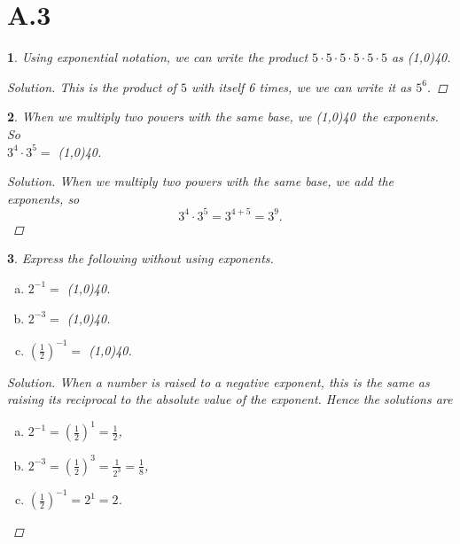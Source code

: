 \documentclass[12pt]{amsart}
\newtheorem{thm}{}
\begin{document}
\section*{A.3}

\setcounter{thm}{0}
\begin{thm}
  Using exponential notation, we can write the product $5 \cdot 5 \cdot 5 \cdot 5 \cdot 5 \cdot 5$ as \line(1,0){40}.
  
  \begin{proof}[Solution]
    This is the product of $5$ with itself 6 times, we we can write it as $5^6$.
  \end{proof}
\end{thm}

\setcounter{thm}{2}
\begin{thm}
  When we multiply two powers with the same base, we \line(1,0){40}\ the exponents.
  So\\ 
  \indent $3^4\cdot 3^5 =$ \line(1,0){40}.
  
  \begin{proof}[Solution]
    When we multiply two powers with the same base, we add the exponents, so 
    $$3^4 \cdot 3^5 = 3^{4 + 5} = 3^9.$$
  \end{proof}
\end{thm}

\setcounter{thm}{5}
\begin{thm}
  Express the following without using exponents.
  \begin{enumerate}[(a)]
  \item
    $2^{-1} =$ \line(1,0){40}.
  \item
    $2^{-3} =$ \line(1,0){40}.
  \item
    $\left(\frac{1}{2}\right)^{-1} =$ \line(1,0){40}.
  \end{enumerate}
  
  \begin{proof}[Solution]
    When a number is raised to a negative exponent, this is the same as raising its reciprocal to the absolute value of the exponent.
    Hence the solutions are
    \begin{enumerate}[(a)]
    \item
      $\displaystyle{2^{-1} = \left(\frac{1}{2}\right)^{1} = \frac{1}{2}}$,
    \item
      $\displaystyle{2^{-3} = \left(\frac{1}{2}\right)^3 = \frac{1}{2^3} = \frac{1}{8}}$,
    \item
      $\displaystyle{\left(\frac{1}{2}\right)^{-1}} = 2^1 = 2$.
    \end{enumerate}
  \end{proof}
\end{thm}
\end{document}
